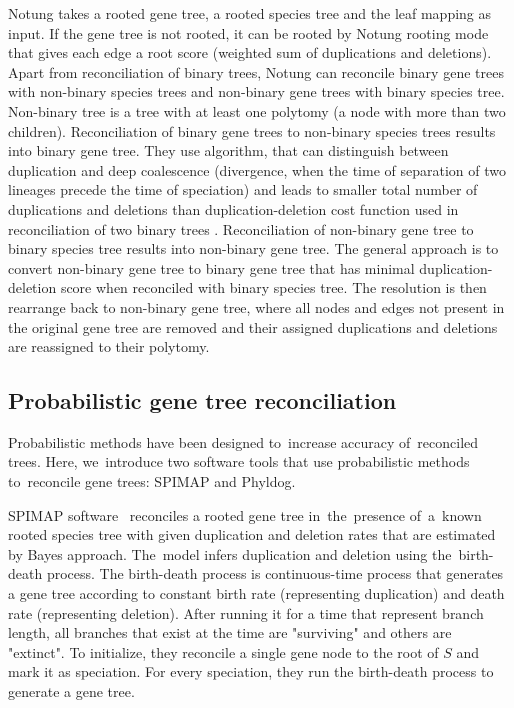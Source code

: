 Notung takes a rooted gene tree, a rooted species tree and the leaf mapping as input. If the gene tree is not rooted, it can be rooted by Notung rooting mode that gives each edge a root score (weighted sum of duplications and deletions). Apart from reconciliation of binary trees, Notung can reconcile binary gene trees with non-binary species trees and non-binary gene trees with binary species tree. Non-binary tree is a tree with at least one polytomy (a node with more than two children).
Reconciliation of binary gene trees to non-binary species trees results into binary gene tree. They use algorithm, that can distinguish between duplication and deep coalescence (divergence, when the time of separation of two  lineages precede the time of speciation) and leads to smaller total number of duplications and deletions than duplication-deletion cost function used in reconciliation of two binary trees \cite{vernot}.
Reconciliation of non-binary gene tree to binary species tree results into non-binary gene tree. The general approach is to convert non-binary gene tree to binary gene tree that has minimal duplication-deletion score when reconciled with binary species tree. The resolution is then rearrange back to non-binary gene tree, where all nodes and edges not present in the original gene tree are removed and their assigned duplications and deletions are reassigned to their polytomy.

\subsection{Probabilistic gene tree reconciliation}
Probabilistic methods have been designed to~increase accuracy of~reconciled trees. Here, we~introduce two software tools that use probabilistic methods to~reconcile gene trees: SPIMAP and Phyldog.

SPIMAP software~\cite{spimap} reconciles a rooted gene tree in~the~presence of~a~known rooted species tree with given duplication and deletion rates that are estimated by Bayes approach. The~model infers duplication and deletion using the~birth-death process. The birth-death process is continuous-time process that generates a gene tree according to constant birth rate (representing duplication) and death rate (representing deletion). After running it for a time that represent branch length, all branches that exist at the time are "surviving" and others are "extinct". To initialize, they reconcile a single gene node to the root of $S$ and mark it as speciation. For every speciation, they run the birth-death process to generate a gene tree.

